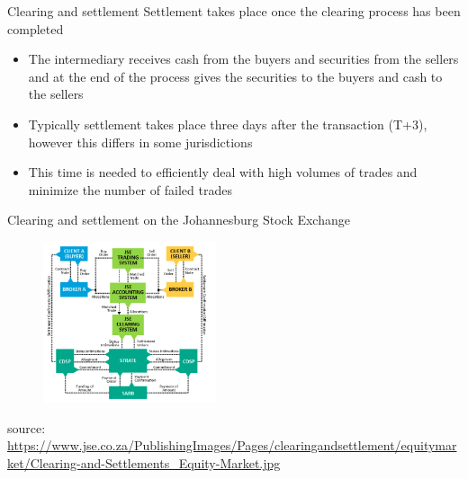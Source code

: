 \documentclass[11pt]{beamer}
\begin{document}

\begin{frame}{Clearing and settlement}
	Settlement takes place once the clearing process has been completed
	\begin{itemize}
		\item The intermediary receives cash from the buyers and securities from the sellers and at the end of the process gives the securities to the buyers and cash to the sellers
		\item Typically settlement takes place three days after the transaction (T+3), however this differs in some jurisdictions
		\item This time is needed to efficiently deal with high volumes of trades and minimize the number of failed trades
	\end{itemize}
\end{frame}


\begin{frame}{Clearing and settlement on the Johannesburg Stock Exchange}
	\begin{figure}[]
		\centering
		\includegraphics  [width=2in]{Images/settle}
	\end{figure}
	\begin{scriptsize}
		source: \href{https://www.jse.co.za/services/post-trade-services/clearing-and-settlement/cash-equities}{https://www.jse.co.za/PublishingImages/Pages/clearingandsettlement/equitymarket/Clearing-and-Settlements\_Equity-Market.jpg}
	\end{scriptsize}
\end{frame}


\end{document}
